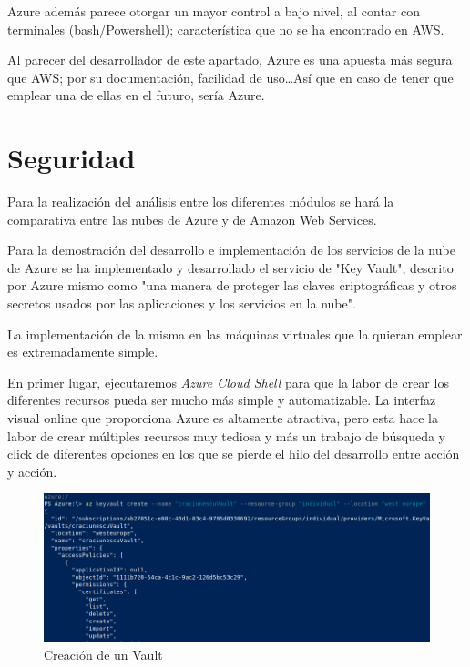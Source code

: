\documentclass[english,runningheads,a4paper]{llncs}[2018/03/10]
\begin{document}
Azure además parece otorgar un mayor control a bajo nivel, al contar con
terminales (bash/Powershell); característica que no se ha encontrado en AWS.

Al parecer del desarrollador de este apartado, Azure es una apuesta más segura
que AWS; por su documentación, facilidad de uso\ldots Así que en caso de tener
que emplear una de ellas en el futuro, sería Azure.

\newpage

\section{Seguridad}

Para la realización del análisis entre los diferentes módulos se hará la
comparativa entre las nubes de Azure y de Amazon Web Services.

Para la demostración del desarrollo e implementación de los servicios de la nube
de Azure se ha implementado y desarrollado el servicio de "Key Vault", descrito
por Azure mismo como "una manera de proteger las claves criptográficas y otros
secretos usados por las aplicaciones y los servicios en la nube".

La implementación de la misma en las máquinas virtuales que la quieran emplear
es extremadamente simple.

En primer lugar, ejecutaremos \textit{Azure Cloud Shell} para que la labor de
crear los diferentes recursos pueda ser mucho más simple y automatizable. La
interfaz visual online que proporciona Azure es altamente atractiva, pero esta
hace la labor de crear múltiples recursos muy tediosa y más un trabajo de
búsqueda y click de diferentes opciones en los que se pierde el hilo del
desarrollo entre acción y acción.

\begin{figure}[h!]
    \includegraphics[width=\linewidth]{./Seguridad/Azure/Selection_011.png}
    \caption{Creación de un Vault}
\end{figure}
\end{document}
